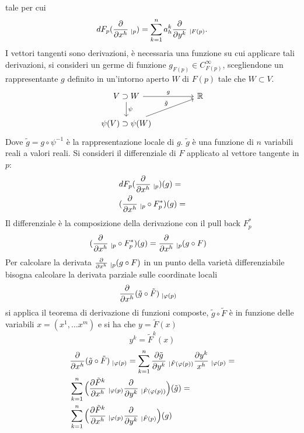 \documentclass[10pt, letterpaper]{report}
\begin{document}
tale per cui\begin{equation}
    dF_p(\frac{\partial}{\partial x^h}\hphantom{.}_{|p})=\sum_{k=1}^na^k_h \frac{\partial}{\partial y^k}\hphantom{.}_{|F(p)}.
\end{equation}
I vettori tangenti sono derivazioni, è necessaria una funzione su cui applicare tali derivazioni,
si consideri un germe di funzione $g_{F(p)}\in C^\infty_{F(p)}$, scegliendone un rappresentante $g$ definito in un'intorno aperto $W$ di $F(p)$ tale che $W\subset V$.
\[
    \begin{tikzcd}
        V \supset W \arrow[rr, "g"] \arrow[d, "\psi"] & & \mathbb{R} \\
        \psi(V) \supset \psi(W) \arrow[urr, "\tilde{g}"] & &
    \end{tikzcd}
\]
Dove $\tilde g=g\circ\psi^{-1}$ è la rappresentazione locale di $g$. $\tilde g$ è una funzione di $n$ variabili reali a valori reali. Si consideri il differenziale di $F$ applicato al vettore tangente in $p$:\begin{align}
    &dF_p(\frac{\partial}{\partial x^h}\hphantom{.}_{|p})(g)=\\
    &(\frac{\partial}{\partial x^h}\hphantom{.}_{|p}\circ F_p^*)(g)=
\end{align}
Il differenziale è la composizione della derivazione con il pull back $F_p^*$
\begin{align}
    &(\frac{\partial}{\partial x^h}\hphantom{.}_{|p}\circ F_p^*)(g)=\frac{\partial}{\partial x^h}\hphantom{.}_{|p}(g\circ F)\end{align}
Per calcolare la derivata $\frac{\partial}{\partial x^h}\hphantom{.}_{|p}(g\circ F)$ in un punto della varietà differenziabile bisogna calcolare la derivata parziale sulle coordinate locali
    \begin{align}
     &\frac{\partial}{\partial x^h}(\tilde g\circ\tilde F)\hphantom{.}_{|\varphi(p)}
\end{align}
si applica il teorema di derivazione di funzioni composte, $\tilde g\circ\tilde F$ è in funzione delle variabili $x=(x^1,\dots x^m)$ e si ha che $y=\tilde F(x)$\begin{equation}
    y^k=\tilde F^k(x)
\end{equation}
    \begin{align}
     &\frac{\partial}{\partial x^h}(\tilde g\circ\tilde F)\hphantom{.}_{|\varphi(p)}=
     \sum_{k=1}^n\frac{\partial\tilde g}{\partial y^k}\hphantom{.}_{|\tilde F(\varphi(p))}\frac{\partial y^k}{x^h}\hphantom{.}_{|\varphi(p)}=\\
     &\sum_{k=1}^n\Big(\frac{\partial\tilde F^k}{\partial x^h}\hphantom{.}_{|\varphi(p)}\frac{\partial}{\partial y^k}\hphantom{.}_{|\tilde F(\varphi(p))}\Big)(\tilde g)=\\
      &\sum_{k=1}^n\Big(\frac{\partial\tilde F^k}{\partial x^h}\hphantom{.}_{|\varphi(p)}\frac{\partial}{\partial y^k}\hphantom{.}_{|\tilde F(p)}\Big)( g)
\end{align}
\end{document}
